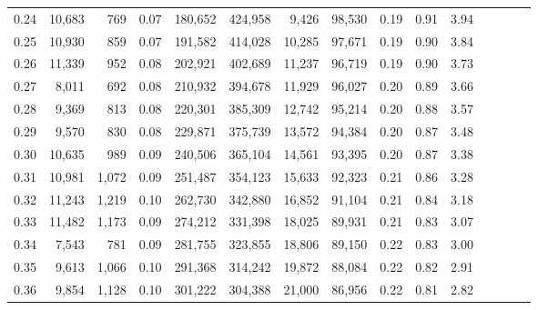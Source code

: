 \begin{tabular}{rrrcrrrrrrrrrrr}
0.24 &  10,683 &    769 &                                       0.07 &  180,652 &  424,958 &    9,426 &   98,530 &  0.19 &  0.91 &                         3.94 \\
0.25 &  10,930 &    859 &                                       0.07 &  191,582 &  414,028 &   10,285 &   97,671 &  0.19 &  0.90 &                         3.84 \\
0.26 &  11,339 &    952 &                                       0.08 &  202,921 &  402,689 &   11,237 &   96,719 &  0.19 &  0.90 &                         3.73 \\
0.27 &   8,011 &    692 &                                       0.08 &  210,932 &  394,678 &   11,929 &   96,027 &  0.20 &  0.89 &                         3.66 \\
0.28 &   9,369 &    813 &                                       0.08 &  220,301 &  385,309 &   12,742 &   95,214 &  0.20 &  0.88 &                         3.57 \\
0.29 &   9,570 &    830 &                                       0.08 &  229,871 &  375,739 &   13,572 &   94,384 &  0.20 &  0.87 &                         3.48 \\
0.30 &  10,635 &    989 &                                       0.09 &  240,506 &  365,104 &   14,561 &   93,395 &  0.20 &  0.87 &                         3.38 \\
0.31 &  10,981 &  1,072 &                                       0.09 &  251,487 &  354,123 &   15,633 &   92,323 &  0.21 &  0.86 &                         3.28 \\
0.32 &  11,243 &  1,219 &                                       0.10 &  262,730 &  342,880 &   16,852 &   91,104 &  0.21 &  0.84 &                         3.18 \\
0.33 &  11,482 &  1,173 &                                       0.09 &  274,212 &  331,398 &   18,025 &   89,931 &  0.21 &  0.83 &                         3.07 \\
0.34 &   7,543 &    781 &                                       0.09 &  281,755 &  323,855 &   18,806 &   89,150 &  0.22 &  0.83 &                         3.00 \\
0.35 &   9,613 &  1,066 &                                       0.10 &  291,368 &  314,242 &   19,872 &   88,084 &  0.22 &  0.82 &                         2.91 \\
0.36 &   9,854 &  1,128 &                                       0.10 &  301,222 &  304,388 &   21,000 &   86,956 &  0.22 &  0.81 &                         2.82 \\

\end{tabular}
